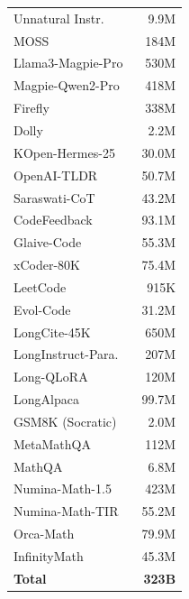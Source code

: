 \begin{table}[!h]
\begin{minipage}[t]{0.245\textwidth}
\begin{tabular}{lr}
Unnatural Instr.~\cite{honovich2023unnatural} & 9.9M \\
MOSS~\cite{sun2024moss} & 184M \\
Llama3-Magpie-Pro~\cite{xu2024magpie} & 530M \\
Magpie-Qwen2-Pro~\cite{xu2024magpie} & 418M \\
Firefly~\cite{yang2023firefly} & 338M \\
Dolly~\cite{conover2023dolly} & 2.2M \\
KOpen-Hermes-25~\cite{kopenhermes2024} & 30.0M \\
OpenAI-TLDR~\cite{stiennon2020learning} & 50.7M \\
Saraswati-CoT~\cite{saraswaticot2024} & 43.2M \\
CodeFeedback~\cite{zheng2024opencodeinterpreter} & 93.1M \\
Glaive-Code~\cite{glaive2023} & 55.3M \\
xCoder-80K~\cite{wang2024xcoder} & 75.4M \\
LeetCode~\cite{leetcode2023} & 915K \\
Evol-Code~\cite{luo2024wizardcoder} & 31.2M \\
LongCite-45K~\cite{zhang2024longcite} & 650M \\
LongInstruct-Para.~\cite{longinstruct2024} & 207M \\
Long-QLoRA~\cite{yang2023longqlora} & 120M \\
LongAlpaca~\cite{chen2024longlora} & 99.7M \\
GSM8K (Socratic)~\cite{cobbe2021gsm8k} & 2.0M \\
MetaMathQA~\cite{yu2024metamath} & 112M \\
MathQA~\cite{amini2019mathqa} & 6.8M \\
Numina-Math-1.5~\cite{numina_math_15} & 423M \\
Numina-Math-TIR~\cite{numina_math_tir} & 55.2M \\
Orca-Math~\cite{mitra2024orcamath} & 79.9M \\
InfinityMath~\cite{zhang2024infinitymath} & 45.3M \\
\midrule
\textbf{Total} & \textbf{323B} \\
\bottomrule
\end{tabular}
\end{minipage}
\end{table}
